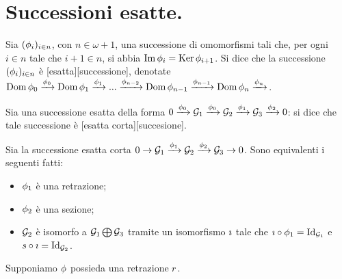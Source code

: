\section{Successioni esatte.}\label{SuccessioniEsatte}
\begin{Definition}
	Sia $(\phi_i)_{i \in n}$, con $n \in \omega + 1$, una
	successione di omomorfismi tali che, per ogni $i \in n$ tale che
	$i + 1 \in n$, si abbia
	$\operatorname{Im}{\phi_i} = \operatorname{Ker}{\phi_{i + 1}}$. Si
	dice che la successione $(\phi_i)_{i \in n}$ \`e
	[esatta][successione], denotate
	$\operatorname{Dom}{\phi_0} \xrightarrow{\phi_0}
	\operatorname{Dom}{\phi_1} \xrightarrow{\phi_1}
	... \xrightarrow{\phi_{n - 2}}
	\operatorname{Dom}{\phi_{n - 1}} \xrightarrow{\phi_{n - 1}}
	\operatorname{Dom}{\phi_n} \xrightarrow{\phi_n}$.
\end{Definition}
\begin{Definition}
	Sia una successione esatta della forma
	$0 \xrightarrow{\phi_0}
	\mathcal{G}_1 \xrightarrow{\phi_0}
	\mathcal{G}_2 \xrightarrow{\phi_1}
	\mathcal{G}_3 \xrightarrow{\phi_2}
	0$:
	si dice che tale successione \`e
	[esatta corta][succesione].
\end{Definition}
\begin{Theorem}
	Sia la successione esatta corta
	$0 \rightarrow
	\mathcal{G}_1 \xrightarrow{\phi_1}
	\mathcal{G}_2 \xrightarrow{\phi_2}
	\mathcal{G}_3 \rightarrow
	0$.
	Sono equivalenti i seguenti fatti:
	\begin{itemize}
		\item $\phi_1$ \`e una retrazione;
		\item $\phi_2$ \`e una sezione;
		\item $\mathcal{G}_2$ \`e isomorfo a
		$\mathcal{G}_1 \bigoplus \mathcal{G}_3$ tramite
		un isomorfismo $\imath$ tale che
		$\Isomorphism \circ \Homomorphism_1 = \Identity_{\Group_1}$
		e $\Section \circ \Isomorphism = \Identity_{\Group_2}$.
	\end{itemize}
\end{Theorem}
\Proof Supponiamo $\phi$ possieda una retrazione $r$.
